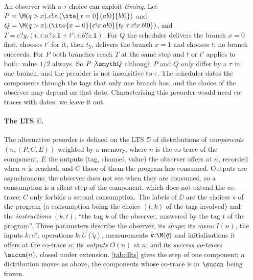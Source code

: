 \begin{remark}
An observer with a $\tau$ choice can exploit \emph{timing}. Let
$P = \M(q \rhd x).c!x.(\ite{x=0}{a!0}{b!0})$ and
$Q = \M(q \rhd x).(\ite{x=0}{c!x.a!0}{t_5{:}\tau.c!x.b!0})$, and
$T = c?y.(t{:}\tau.a?z.\mathbf{1} + t'{:}\tau.b?z.\mathbf{1})$. For $Q$
the scheduler delivers the branch $x=0$ first, chooses $t'$ for it, then
$t_5$, delivers the branch $x=1$ and chooses $t$: no branch succeeds. For $P$
both branches reach $T$ at the same step and $t$ or $t'$ applies to both:
value $1/2$ always. So $P \not\smyth Q$ although $P$ and $Q$ only differ by
a $\tau$ in one branch, and the preorder is not insensitive to $\tau$. The
scheduler dates the components through the tags that only one branch has,
and the choice of the observer may depend on that date. Characterising this
preorder would need co-traces with dates; we leave it out.
\end{remark}

\paragraph{The LTS $\DD$.} The alternative preorder is defined on the
LTS $\DD$ of distributions of \emph{components} $(n, (P, C, E))$ weighted
by a memory, where $n$ is the co-trace of the component, $E$ the outputs
(tag, channel, value) the observer offers at $n$, recorded when $n$ is
reached, and $C$ those of them the program has consumed. Outputs are
asynchronous: the observer does not see when they are consumed, so a
consumption is a silent step of the component, which does not extend the
co-trace; $C$ only forbids a second consumption. The labels of $\DD$ are
the choices $s$ of the program (a consumption being the choice $(t,k)$ of
the tags involved) and the \emph{instructions} $(k, t)$, ``the tag $k$ of
the observer, answered by the tag $t$ of the program''. Three parameters
describe the observer, its \emph{shape}: its \emph{menu} $I(n)$, the inputs
$k{:}c?$, operations $k{:}U(\tilde q)$, measurements $k{:}\M(\tilde q)$ and
initialisations it offers at the co-trace $n$; its \emph{outputs} $O(n)$ at
$n$; and its \emph{success co-traces} $\succn(n)$, closed under extension.
\cref{tab:dlts} gives the step of one component; a distribution moves as
above, the components whose co-trace is in $\succn$ being frozen.

